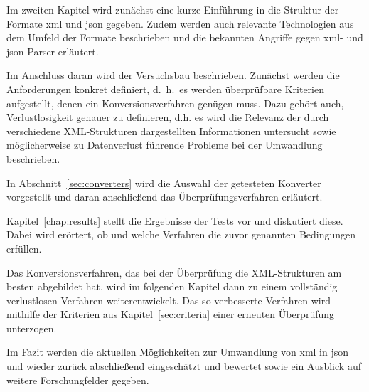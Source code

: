 Im zweiten Kapitel wird zunächst eine kurze Einführung in die Struktur der Formate \acrshort{xml} und \acrshort{json} gegeben. Zudem werden auch relevante Technologien aus dem Umfeld der Formate beschrieben und die bekannten Angriffe gegen \acrshort{xml}- und \acrshort{json}-Parser erläutert.

Im Anschluss daran wird der Versuchsbau beschrieben. Zunächst werden die Anforderungen konkret definiert, d.~h.\ es werden
überprüfbare Kriterien aufgestellt, denen ein Konversionsverfahren genügen
muss. Dazu gehört auch, Verlustlosigkeit genauer zu definieren, d.h.
es wird die Relevanz der durch verschiedene XML-Strukturen dargestellten
Informationen untersucht sowie möglicherweise zu Datenverlust führende
Probleme bei der Umwandlung beschrieben.

In Abschnitt~\ref{sec:converters} wird die Auswahl der getesteten Konverter vorgestellt und daran anschließend das Überprüfungsverfahren erläutert.

Kapitel~\ref{chap:results} stellt die Ergebnisse der Tests vor und diskutiert diese.
Dabei wird erörtert, ob und welche Verfahren die zuvor genannten Bedingungen
erfüllen.

Das Konversionsverfahren, das bei der Überprüfung die XML-Strukturen am besten abgebildet hat, wird im folgenden Kapitel dann zu einem vollständig verlustlosen Verfahren weiterentwickelt. Das so verbesserte Verfahren wird mithilfe der Kriterien aus Kapitel~\ref{sec:criteria} einer erneuten Überprüfung unterzogen.

Im Fazit werden die aktuellen Möglichkeiten zur Umwandlung
von \acrshort{xml} in \acrshort{json} und wieder zurück abschließend eingeschätzt und bewertet sowie ein Ausblick auf weitere Forschungfelder gegeben.
